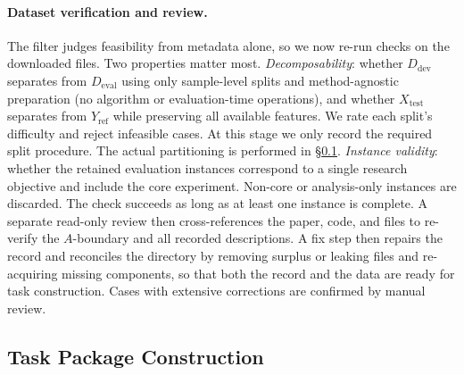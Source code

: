 \documentclass{llmxive}
\begin{document}
\paragraph{Dataset verification and review.}
The filter judges feasibility from metadata alone, so we now re-run checks on the downloaded files. Two properties matter most.
\emph{Decomposability}: whether $D_\text{dev}$ separates from $D_\text{eval}$ using only sample-level splits and method-agnostic preparation (no algorithm or evaluation-time operations), and whether $X_\text{test}$ separates from $Y_\text{ref}$ while preserving all available features. We rate each split’s difficulty and reject infeasible cases. At this stage we only record the required split procedure. The actual partitioning is performed in \S\ref{sec:gym:build}.
\emph{Instance validity}: whether the retained evaluation instances correspond to a single research objective and include the core experiment. Non-core or analysis-only instances are discarded.
The check succeeds as long as at least one instance is complete.
A separate read-only review then cross-references the paper, code, and files to re-verify the $A$-boundary and all recorded descriptions. A fix step then repairs the record and reconciles the directory by removing surplus or leaking files and re-acquiring missing components, so that both the record and the data are ready for task construction. Cases with extensive corrections are confirmed by manual review.



\subsection{Task Package Construction}
\label{sec:gym:build}
\end{document}
